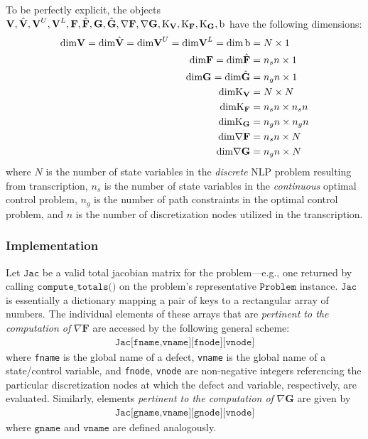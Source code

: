 \documentclass{article}
\begin{document}
\noindent
To be perfectly explicit, the objects $\textbf{V},\Hat{\textbf{V}},\textbf{V}^U,\textbf{V}^L,\textbf{F},\Hat{\textbf{F}},\textbf{G},\Hat{\textbf{G}},\nabla \textbf{F},\nabla \textbf{G},\text{K}_\textbf{V},\text{K}_\textbf{F},\text{K}_\textbf{G},\text{b}$ have the following dimensions:
\begin{align*}
    \text{dim} \textbf{V} = \text{dim} \Hat{\textbf{V}} = \text{dim} \textbf{V}^U = \text{dim} \textbf{V}^L = \text{dim}\,\text{b} &= N \times 1 \\
    \text{dim} \textbf{F} = \text{dim} \Hat{\textbf{F}} &= n_sn \times 1 \\
    \text{dim} \textbf{G} = \text{dim} \Hat{\textbf{G}} &= n_gn \times 1 \\
    \text{dim} \text{K}_\textbf{V} &= N \times N \\
    \text{dim} \text{K}_\textbf{F} &= n_sn \times n_sn \\
    \text{dim} \text{K}_\textbf{G} &= n_gn \times n_gn \\
    \text{dim} \nabla \textbf{F} &= n_sn \times N \\
    \text{dim} \nabla \textbf{G} &= n_gn \times N
\end{align*}
where $N$ is the number of state variables in the \textit{discrete} NLP problem resulting from transcription, $n_s$ is the number of state variables in the \textit{continuous} optimal control problem, $n_g$ is the number of path constraints in the optimal control problem, and $n$ is the number of discretization nodes utilized in the transcription.

\subsubsection*{Implementation}

Let $\texttt{Jac}$ be a valid total jacobian matrix for the problem---e.g., one returned by calling $\texttt{compute\_totals()}$ on the problem's representative $\texttt{Problem}$ instance. $\texttt{Jac}$ is essentially a dictionary mapping a pair of keys to a rectangular array of numbers. The individual elements of these arrays that are \textit{pertinent to the computation of} $\nabla \textbf{F}$ are accessed by the following general scheme:
\begin{align*}
    \texttt{Jac[fname,vname][fnode][vnode]}
\end{align*}
where \texttt{fname} is the global name of a defect, \texttt{vname} is the global name of a state/control variable, and \texttt{fnode}, \texttt{vnode} are non-negative integers referencing the particular discretization nodes at which the defect and variable, respectively, are evaluated. Similarly, elements \textit{pertinent to the computation of} $\nabla \textbf{G}$ are given by
\begin{align*}
    \texttt{Jac[gname,vname][gnode][vnode]}
\end{align*}
where $\texttt{gname}$ and $\texttt{vname}$ are defined analogously.
\end{document}

